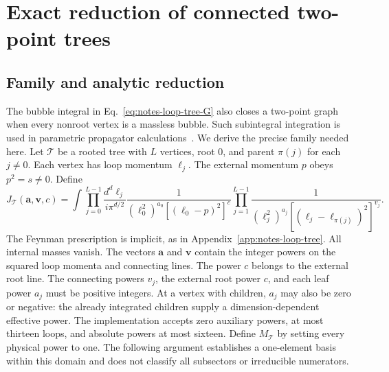 \section{Exact reduction of connected two-point trees}
\label{app:notes-prop-tree}
\subsection{Family and analytic reduction}
The bubble integral in Eq.~\eqref{eq:notes-loop-tree-G} also closes a two-point graph when every nonroot vertex is a massless bubble. Such subintegral integration is used in parametric propagator calculations~\cite{Ruijl2017Forcer}. We derive the precise family needed here. Let $\mathcal T$ be a rooted tree with $L$ vertices, root $0$, and parent $\pi(j)$ for each $j\ne0$. Each vertex has loop momentum $\ell_j$. The external momentum $p$ obeys $p^2=s\ne0$. Define
\begin{equation}
 J_{\mathcal T}(\boldsymbol a,\boldsymbol v,c)=
 \int\prod_{j=0}^{L-1}\frac{d^d\ell_j}{i\pi^{d/2}}
 \frac{1}{(\ell_0^2)^{a_0}[(\ell_0-p)^2]^c}
 \prod_{j=1}^{L-1}
 \frac{1}{(\ell_j^2)^{a_j}[(\ell_j-\ell_{\pi(j)})^2]^{v_j}}.
 \label{eq:notes-prop-tree-family}
\end{equation}
The Feynman prescription is implicit, as in Appendix~\ref{app:notes-loop-tree}. All internal masses vanish. The vectors $\boldsymbol a$ and $\boldsymbol v$ contain the integer powers on the squared loop momenta and connecting lines. The power $c$ belongs to the external root line. The connecting powers $v_j$, the external root power $c$, and each leaf power $a_j$ must be positive integers. At a vertex with children, $a_j$ may also be zero or negative: the already integrated children supply a dimension-dependent effective power. The implementation accepts zero auxiliary powers, at most thirteen loops, and absolute powers at most sixteen. Define $M_{\mathcal T}$ by setting every physical power to one. The following argument establishes a one-element basis within this domain and does not classify all subsectors or irreducible numerators.

